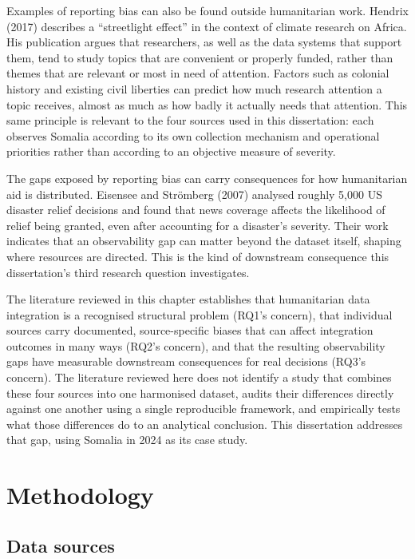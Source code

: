 \documentclass[12pt,a4paper]{article}
\begin{document}
Examples of reporting bias can also be found outside humanitarian work. Hendrix (2017) describes a ``streetlight effect'' in the context of climate research on Africa. His publication argues that researchers, as well as the data systems that support them, tend to study topics that are convenient or properly funded, rather than themes that are relevant or most in need of attention. Factors such as colonial history and existing civil liberties can predict how much research attention a topic receives, almost as much as how badly it actually needs that attention. This same principle is relevant to the four sources used in this dissertation: each observes Somalia according to its own collection mechanism and operational priorities rather than according to an objective measure of severity.

The gaps exposed by reporting bias can carry consequences for how humanitarian aid is distributed. Eisensee and Str\"omberg (2007) analysed roughly 5,000 US disaster relief decisions and found that news coverage affects the likelihood of relief being granted, even after accounting for a disaster's severity. Their work indicates that an observability gap can matter beyond the dataset itself, shaping where resources are directed. This is the kind of downstream consequence this dissertation's third research question investigates.

The literature reviewed in this chapter establishes that humanitarian data integration is a recognised structural problem (RQ1's concern), that individual sources carry documented, source-specific biases that can affect integration outcomes in many ways (RQ2's concern), and that the resulting observability gaps have measurable downstream consequences for real decisions (RQ3's concern). The literature reviewed here does not identify a study that combines these four sources into one harmonised dataset, audits their differences directly against one another using a single reproducible framework, and empirically tests what those differences do to an analytical conclusion. This dissertation addresses that gap, using Somalia in 2024 as its case study.

\clearpage
\section{Methodology}

\subsection{Data sources}
\end{document}
